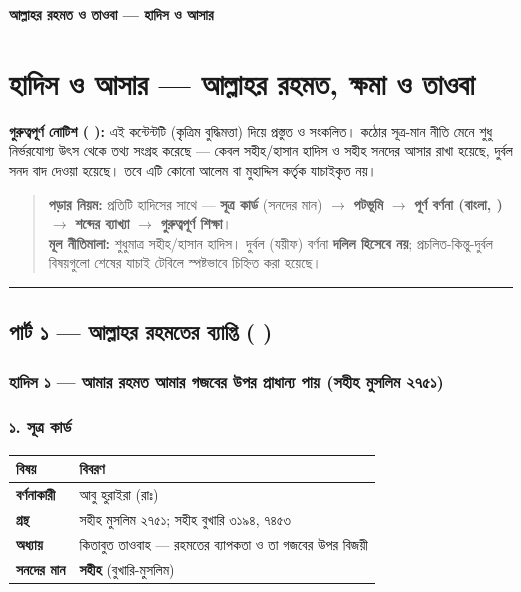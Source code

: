 

\begin{center}{\Large\bfseries\color{emerald} আল্লাহর রহমত ও তাওবা — হাদিস ও আসার}\end{center}
\vspace{1em}
\section*{হাদিস ও আসার — আল্লাহর রহমত, ক্ষমা ও তাওবা}

\begin{warnbox}
 \textbf{গুরুত্বপূর্ণ নোটিশ ( ):} এই কন্টেন্টটি  (কৃত্রিম বুদ্ধিমত্তা) দিয়ে প্রস্তুত ও সংকলিত।  কঠোর সূত্র-মান নীতি মেনে শুধু নির্ভরযোগ্য উৎস থেকে তথ্য সংগ্রহ করেছে — কেবল সহীহ/হাসান হাদিস ও সহীহ সনদের আসার রাখা হয়েছে, দুর্বল সনদ বাদ দেওয়া হয়েছে। তবে এটি কোনো আলেম বা মুহাদ্দিস কর্তৃক যাচাইকৃত নয়।
\end{warnbox}

\begin{quote}
\textbf{পড়ার নিয়ম:} প্রতিটি হাদিসের সাথে — \textbf{সূত্র কার্ড} (সনদের মান) $\rightarrow$ \textbf{পটভূমি} $\rightarrow$ \textbf{পূর্ণ বর্ণনা (বাংলা, )} $\rightarrow$ \textbf{শব্দের ব্যাখ্যা} $\rightarrow$ \textbf{গুরুত্বপূর্ণ শিক্ষা}। \\
\textbf{মূল নীতিমালা:} শুধুমাত্র সহীহ/হাসান হাদিস। দুর্বল (যয়ীফ) বর্ণনা \textbf{দলিল হিসেবে নয়}; প্রচলিত-কিন্তু-দুর্বল বিষয়গুলো শেষের যাচাই টেবিলে স্পষ্টভাবে চিহ্নিত করা হয়েছে।
\end{quote}

\medskip\hrule\medskip

\subsection*{পার্ট ১ — আল্লাহর রহমতের ব্যাপ্তি (   )}

\subsubsection*{হাদিস ১ — আমার রহমত আমার গজবের উপর প্রাধান্য পায় (সহীহ মুসলিম ২৭৫১)}

\subsubsection*{১. সূত্র কার্ড}

\begin{table}[h]\centering\small
\begin{tabular}{ll}
বিষয় & বিবরণ \\
\hline
\textbf{বর্ণনাকারী} & আবু হুরাইরা (রাঃ) \\
\textbf{গ্রন্থ} & সহীহ মুসলিম ২৭৫১; সহীহ বুখারি ৩১৯৪, ৭৪৫৩ \\
\textbf{অধ্যায়} & কিতাবুত তাওবাহ — রহমতের ব্যাপকতা ও তা গজবের উপর বিজয়ী \\
\textbf{সনদের মান} & \textbf{সহীহ} (বুখারি-মুসলিম) \\
\hline
\end{tabular}
\end{table}

